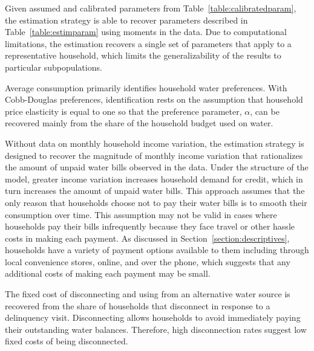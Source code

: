 \documentclass[12pt]{article}
\begin{document}

Given assumed and calibrated parameters from Table~\ref{table:calibratedparam}, the estimation strategy is able to recover parameters described in Table~\ref{table:estimparam} using moments in the data.  Due to computational limitations, the estimation recovers a single set of parameters that apply to a representative household, which limits the generalizability of the results to particular subpopulations.  

Average consumption primarily identifies household water preferences.  With Cobb-Douglas preferences, identification rests on the assumption that household price elasticity is equal to one so that the preference parameter, $\alpha$, can be recovered mainly from the share of the household budget used on water.

Without data on monthly household income variation, the estimation strategy is designed to recover the magnitude of monthly income variation that rationalizes the amount of unpaid water bills observed in the data.  Under the structure of the model, greater income variation increases household demand for credit, which in turn increases the amount of unpaid water bills.  This approach assumes that the only reason that households choose not to pay their water bills is to smooth their consumption over time.  This assumption may not be valid in cases where households pay their bills infrequently because they face travel or other hassle costs in making each payment.  As discussed in Section~\ref{section:descriptives}, households have a variety of payment options available to them including through local convenience stores, online, and over the phone, which suggests that any additional costs of making each payment may be small. %

The fixed cost of disconnecting and using from an alternative water source is recovered from the share of households that disconnect in response to a delinquency visit.  Disconnecting allows households to avoid immediately paying their outstanding water balances.  Therefore, high disconnection rates suggest low fixed costs of being disconnected.
\end{document}
